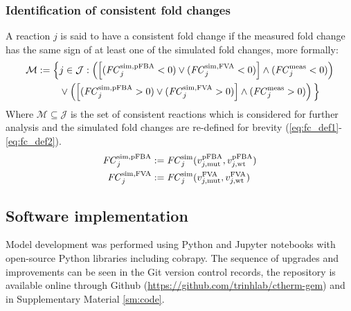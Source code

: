 \subsubsection{Identification of consistent fold changes}
A reaction $j$ is said to have a consistent fold change if the measured fold change has the same sign of at least one of the simulated fold changes, more formally:
\begin{equation} \label{eq:cons}
    \begin{aligned}
        \mathcal{M} := \Big\{ & j\in\mathcal{J}: \left( \left[ (\mathit{FC}_j^{\mathrm{sim},\mathrm{pFBA}}<0) \lor (\mathit{FC}_j^{\mathrm{sim},\mathrm{FVA}}<0) \right] \land (\mathit{FC}_j^{\mathrm{meas}}<0) \right) \\
        & \lor \left( \left[ (\mathit{FC}_j^{\mathrm{sim},\mathrm{pFBA}}>0) \lor (\mathit{FC}_j^{\mathrm{sim},\mathrm{FVA}}>0) \right] \land (\mathit{FC}_j^{\mathrm{meas}}>0) \right) \Big\}
    \end{aligned}
\end{equation}
Where $\mathcal{M} \subseteq \mathcal{J}$ is the set of consistent reactions which is considered for further analysis and the simulated fold changes are re-defined for brevity (\ref{eq:fc_def1}-\ref{eq:fc_def2}).
\begin{alignat}{3}
    \mathit{FC}_j^{\mathrm{sim},\mathrm{pFBA}} &:= \mathit{FC}_j^{\mathrm{sim}} (v_{j,\text{mut}}^{\mathrm{pFBA}}, v_{j,\text{wt}}^{\mathrm{pFBA}}) \label{eq:fc_def1}\\
    \mathit{FC}_j^{\mathrm{sim},\mathrm{FVA}} &:= \mathit{FC}_j^{\mathrm{sim}} (v_{j,\text{mut}}^{\mathrm{FVA}}, v_{j,\text{wt}}^{\mathrm{FVA}}) \label{eq:fc_def2}
\end{alignat}


\subsection{Software implementation}
Model development was performed using Python and Jupyter notebooks with open-source Python libraries including cobrapy.\citep{ebrahim2013}
The sequence of upgrades and improvements can be seen in the Git version
control records, the repository is available online through Github (\url{https://github.com/trinhlab/ctherm-gem}) and in Supplementary Material \ref{sm:code}.


